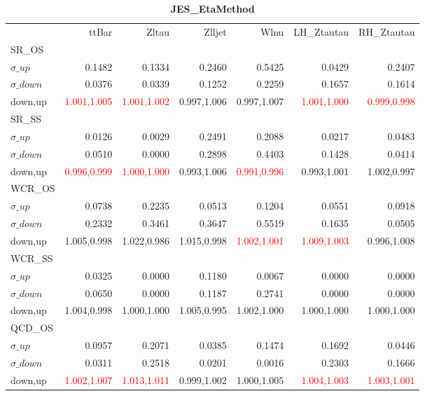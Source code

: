 \documentclass[11pt,oneside,a4paper]{article}
\begin{document}
\begin{table}
\centering
\caption{\bf{JES\_EtaMethod}}
\begin{tabular}{lrrrrrr}
 & ttBar & Zltau & Zlljet & Wlnu & LH\_Ztautau & RH\_Ztautau \\
SR\_OS &  &  &  &  &  &  \\
$\sigma\_up$ & 0.1482 & 0.1334 & 0.2460 & 0.5425 & 0.0429 & 0.2407 \\
$\sigma\_down$ & 0.0376 & 0.0339 & 0.1252 & 0.2259 & 0.1657 & 0.1614 \\
down,up & \textcolor{red}{1.001,1.005} & \textcolor{red}{1.001,1.002} & 0.997,1.006 & 0.997,1.007 & \textcolor{red}{1.001,1.000} & \textcolor{red}{0.999,0.998} \\

\hline
SR\_SS &  &  &  &  &  &  \\
$\sigma\_up$ & 0.0126 & 0.0029 & 0.2491 & 0.2088 & 0.0217 & 0.0483 \\
$\sigma\_down$ & 0.0510 & 0.0000 & 0.2898 & 0.4403 & 0.1428 & 0.0414 \\
down,up & \textcolor{red}{0.996,0.999} & \textcolor{red}{1.000,1.000} & 0.993,1.006 & \textcolor{red}{0.991,0.996} & 0.993,1.001 & 1.002,0.997 \\

\hline
WCR\_OS &  &  &  &  &  &  \\
$\sigma\_up$ & 0.0738 & 0.2235 & 0.0513 & 0.1204 & 0.0551 & 0.0918 \\
$\sigma\_down$ & 0.2332 & 0.3461 & 0.3647 & 0.5519 & 0.1635 & 0.0505 \\
down,up & 1.005,0.998 & 1.022,0.986 & 1.015,0.998 & \textcolor{red}{1.002,1.001} & \textcolor{red}{1.009,1.003} & 0.996,1.008 \\

\hline
WCR\_SS &  &  &  &  &  &  \\
$\sigma\_up$ & 0.0325 & 0.0000 & 0.1180 & 0.0067 & 0.0000 & 0.0000 \\
$\sigma\_down$ & 0.0650 & 0.0000 & 0.1187 & 0.2741 & 0.0000 & 0.0000 \\
down,up & 1.004,0.998 & 1.000,1.000 & 1.005,0.995 & 1.002,1.000 & 1.000,1.000 & 1.000,1.000 \\

\hline
QCD\_OS &  &  &  &  &  &  \\
$\sigma\_up$ & 0.0957 & 0.2071 & 0.0385 & 0.1474 & 0.1692 & 0.0446 \\
$\sigma\_down$ & 0.0311 & 0.2518 & 0.0201 & 0.0016 & 0.2303 & 0.1666 \\
down,up & \textcolor{red}{1.002,1.007} & \textcolor{red}{1.013,1.011} & 0.999,1.002 & 1.000,1.005 & \textcolor{red}{1.004,1.003} & \textcolor{red}{1.003,1.001} \\


\end{tabular}
\end{table}
\end{document}
